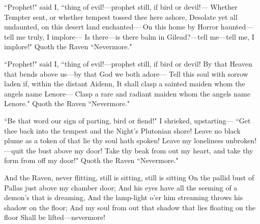 \documentclass{article}
\begin{document}
``Prophet!" said I, ``thing of evil!---prophet still, if bird or devil!---
Whether Tempter sent, or whether tempest tossed thee here ashore,
Desolate yet all undaunted, on this desert land enchanted---
On this home by Horror haunted---tell me truly, I implore---
Is there---is there balm in Gilead?---tell me---tell me, I implore!"
Quoth the Raven ``Nevermore."

``Prophet!" said I, ``thing of evil!---prophet still, if bird or devil!
By that Heaven that bends above us---by that God we both adore---
Tell this soul with sorrow laden if, within the distant Aidenn,
It shall clasp a sainted maiden whom the angels name Lenore---
Clasp a rare and radiant maiden whom the angels name Lenore."
Quoth the Raven ``Nevermore."

``Be that word our sign of parting, bird or fiend!" I shrieked, upstarting---
``Get thee back into the tempest and the Night’s Plutonian shore!
Leave no black plume as a token of that lie thy soul hath spoken!
Leave my loneliness unbroken!---quit the bust above my door!
Take thy beak from out my heart, and take thy form from off my door!"
Quoth the Raven ``Nevermore."

And the Raven, never flitting, still is sitting, still is sitting
On the pallid bust of Pallas just above my chamber door;
And his eyes have all the seeming of a demon’s that is dreaming,
And the lamp-light o’er him streaming throws his shadow on the floor;
And my soul from out that shadow that lies floating on the floor
Shall be lifted---nevermore!
\end{document}
